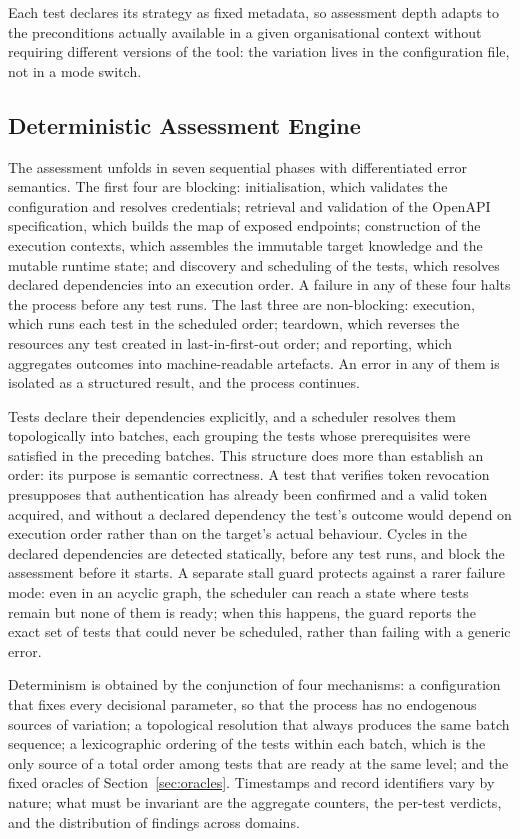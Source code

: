 \documentclass[
]{ceurart}
\begin{document}
Each test declares its strategy as fixed metadata, so assessment depth adapts to the preconditions actually available in a given organisational context without requiring different versions of the tool: the variation lives in the configuration file, not in a mode switch.

\subsection{Deterministic Assessment Engine}

The assessment unfolds in seven sequential phases with differentiated error semantics.
The first four are blocking: initialisation, which validates the configuration and resolves credentials; retrieval and validation of the OpenAPI specification, which builds the map of exposed endpoints; construction of the execution contexts, which assembles the immutable target knowledge and the mutable runtime state; and discovery and scheduling of the tests, which resolves declared dependencies into an execution order.
A failure in any of these four halts the process before any test runs.
The last three are non-blocking: execution, which runs each test in the scheduled order; teardown, which reverses the resources any test created in last-in-first-out order; and reporting, which aggregates outcomes into machine-readable artefacts.
An error in any of them is isolated as a structured result, and the process continues.

Tests declare their dependencies explicitly, and a scheduler resolves them topologically into batches, each grouping the tests whose prerequisites were satisfied in the preceding batches.
This structure does more than establish an order: its purpose is semantic correctness.
A test that verifies token revocation presupposes that authentication has already been confirmed and a valid token acquired, and without a declared dependency the test's outcome would depend on execution order rather than on the target's actual behaviour.
Cycles in the declared dependencies are detected statically, before any test runs, and block the assessment before it starts.
A separate stall guard protects against a rarer failure mode: even in an acyclic graph, the scheduler can reach a state where tests remain but none of them is ready; when this happens, the guard reports the exact set of tests that could never be scheduled, rather than failing with a generic error.

Determinism is obtained by the conjunction of four mechanisms: a configuration that fixes every decisional parameter, so that the process has no endogenous sources of variation; a topological resolution that always produces the same batch sequence; a lexicographic ordering of the tests within each batch, which is the only source of a total order among tests that are ready at the same level; and the fixed oracles of Section~\ref{sec:oracles}.
Timestamps and record identifiers vary by nature; what must be invariant are the aggregate counters, the per-test verdicts, and the distribution of findings across domains.
\end{document}
